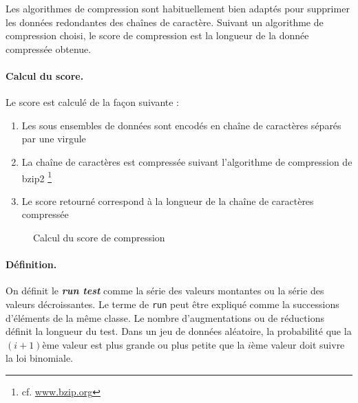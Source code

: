 Les algorithmes de compression sont habituellement bien adaptés pour supprimer les données redondantes des chaînes de caractère. Suivant un algorithme de compression choisi, le score de compression est la longueur de la donnée compressée obtenue. 

\paragraph{Calcul du score.\\}
Le score est calculé de la façon suivante :
\begin{enumerate}
\item Les sous ensembles de données sont encodés en chaîne de caractères séparés par une virgule
\item La chaîne de caractères est compressée suivant l'algorithme de compression de bzip2 \footnote{cf. \url{www.bzip.org}}
\item Le score retourné correspond à la longueur de la chaîne de caractères compressée
\end{enumerate}

\begin{figure}[H]
\begin{center}
\end{center}
\caption{Calcul du score de compression}
\end{figure}

\paragraph{Définition.\\}
On définit le \textbf{\textit{run test}} comme la série des valeurs montantes ou la série des valeurs décroissantes. Le terme de \texttt{run} peut être expliqué comme la successions d'éléments de la même classe. Le nombre d'augmentations ou de réductions définit la longueur du test.  Dans un jeu de données aléatoire, la probabilité que la $(i+1)$ème valeur est plus grande ou plus petite que la $i$ème valeur doit suivre la loi binomiale.\\

